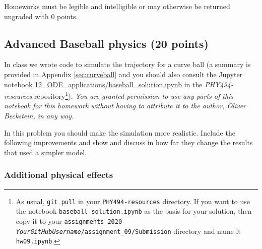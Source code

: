 \documentclass[letterpaper]{scrartcl}
\newcommand{\anumber}{9}
\newcommand{\anum}{0\anumber}
\begin{document}
Homeworks must be legible and intelligible or may otherwise be
returned ungraded with 0 points.




\subsection{Advanced Baseball physics (20 points)}
\label{sec:advanced}

In class we wrote code to simulate the trajectory for a curve ball (a
summary is provided in Appendix \ref{sec:curveball} and you should
also consult the Jupyter notebook
\href{https://github.com/ASU-CompMethodsPhysics-PHY494/PHY494-resources/blob/master/12_ODE_applications/baseball_solution.ipynb}{12\_ODE\_applications/baseball\_solution.ipynb}
in the \emph{PHY494-resources} repository\footnote{As usual,
  \texttt{git pull} in your \texttt{PHY494-resources} directory. If
  you want to use the notebook \texttt{baseball\_solution.ipynb} as
  the basis for your solution, then copy it to your
  \texttt{assignments-2020-\emph{YourGitHubUsername}/assignment\_\anum/Submission}
  directory and name it \texttt{hw09.ipynb}.}). \emph{You are granted
  permission to use any parts of this notebook for this homework
  without having to attribute it to the author, Oliver Beckstein, in
  any way.}

In this problem you should make the simulation more realistic. Include
the following improvements and show and discuss in how far they change
the results that used a simpler model.

\subsubsection{Additional physical effects}
\label{sec:add}
\end{document}
